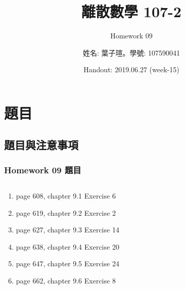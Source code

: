 \documentclass[12pt,hyperref={bookmarks=false}]{beamer}
\title{離散數學 107-2}
\subtitle{Homework 09}
\author{姓名: 葉子瑄。學號: 107590041}
\date{Handout: 2019.06.27 (week-15)}
\begin{document}

\begin{frame}
\titlepage
\end{frame}

\raggedright

\begin{frame}
\footnotesize
\tableofcontents
\end{frame}
	
\section{題目}

	\subsection{題目與注意事項}
	
	\begin{frame}
	\frametitle{Homework 09 題目}
	\fontsize{10pt}{11pt}\selectfont
	\setlength{\baselineskip}{5pt}
	\begin{columns}
	\begin{column}{0.68\textwidth}
	\begin{enumerate}[label=(Prob. \arabic*)]
	\setlength\itemsep{0em}
	\item page 608, chapter 9.1 Exercise 6
	\item page 619, chapter 9.2 Exercise 2
	\item page 627, chapter 9.3 Exercise 14
	\item page 638, chapter 9.4 Exercise 20
	\item page 647, chapter 9.5 Exercise 24
	\item page 662, chapter 9.6 Exercise 8
	\end{enumerate}
	\end{column}
	
	
	\end{columns}
	\end{frame}
	
\end{document}
